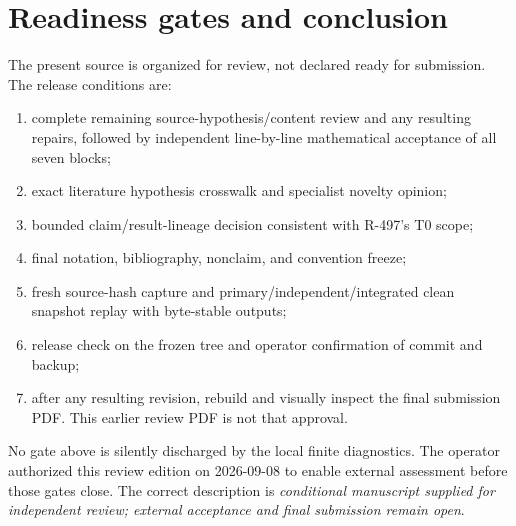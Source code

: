 \documentclass[11pt]{article}
\numberwithin{equation}{section}
\theoremstyle{definition}
\begin{document}
\section{Readiness gates and conclusion}
\label{sec:readiness}

The present source is organized for review, not declared ready for submission.
The release conditions are:
\begin{enumerate}[label=\textup{(G\arabic*)},leftmargin=2.3em]
\item complete remaining source-hypothesis/content review and any resulting repairs, followed by independent
      line-by-line mathematical acceptance of all seven blocks;
\item exact literature hypothesis crosswalk and specialist novelty opinion;
\item bounded claim/result-lineage decision consistent with R-497's T0 scope;
\item final notation, bibliography, nonclaim, and convention freeze;
\item fresh source-hash capture and primary/independent/integrated clean
      snapshot replay with byte-stable outputs;
\item release check on the frozen tree and operator confirmation of commit and
      backup;
\item after any resulting revision, rebuild and visually inspect the
      final submission PDF. This earlier review PDF is not that approval.
\end{enumerate}
No gate above is silently discharged by the local finite diagnostics.  The operator authorized this review edition on 2026-09-08 to enable
external assessment before those gates close. The correct description is
\textit{conditional manuscript supplied for independent review;
external acceptance and final submission remain open}.
\end{document}
